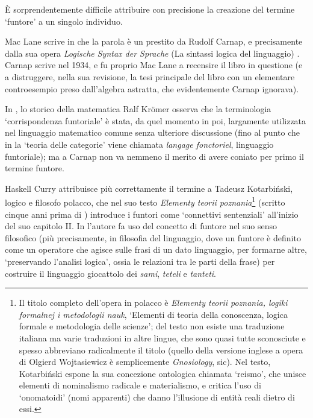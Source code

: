 \begin{terminology}
 È sorprendentemente difficile attribuire con precisione la creazione del termine `funtore' a un singolo individuo.

 Mac Lane scrive in \cite[note al cap. 1]{working-categories} che la parola è un prestito da Rudolf Carnap, e precisamente dalla sua opera \emph{Logische Syntax der Sprache} (La sintassi logica del linguaggio) \cite{carnappio}. Carnap scrive nel 1934, e fu proprio Mac Lane a recensire il libro in questione (e a distruggere, nella sua revisione, la tesi principale del libro con un elementare controesempio preso dall'algebra astratta, che evidentemente Carnap ignorava).

  In \cite{kromer}, lo storico della matematica Ralf Kr\"omer osserva che la terminologia `corrispondenza funtoriale' è stata, da quel momento in poi, largamente utilizzata nel linguaggio matematico comune senza ulteriore discussione (fino al punto che in \cite{grothendieck1965introduction} la `teoria delle categorie' viene chiamata \emph{langage fonctoriel}, linguaggio funtoriale); ma a Carnap non va nemmeno il merito di avere coniato per primo il termine funtore.

 Haskell Curry \cite{Curry1961SomeLA} attribuisce più correttamente il termine a Tadeusz Kotarbiński, logico e filosofo polacco, che nel suo testo \emph{Elementy teorii poznania}\footnote{Il titolo completo dell'opera in polacco è \emph{Elementy teorii poznania, logiki formalnej i metodologii nauk}, `Elementi di teoria della conoscenza, logica formale e metodologia delle scienze'; del testo non esiste una traduzione italiana ma varie traduzioni in altre lingue, che sono quasi tutte sconosciute e spesso abbreviano radicalmente il titolo (quello della versione inglese a opera di Olgierd Wojtasiewicz è semplicemente \emph{Gnosiology}, sic). Nel testo, Kotarbiński espone la sua concezione ontologica chiamata `reismo', che unisce elementi di nominalismo radicale e materialismo, e critica l'uso di `onomatoidi' (nomi apparenti) che danno l'illusione di entità reali dietro di essi.} (scritto cinque anni prima di \cite{carnappio}) introduce i funtori come `connettivi sentenziali' all'inizio del suo capitolo II.  In \cite{Curry1961SomeLA} l'autore fa uso del concetto di funtore nel suo senso filosofico (più precisamente, in filosofia del linguaggio, dove un funtore è definito come un operatore che agisce sulle frasi di un dato linguaggio, per formarne altre, `preservando l'analisi logica', ossia le relazioni tra le parti della frase) per costruire il linguaggio giocattolo dei \emph{sami}, \emph{teteli} e \emph{tanteti}.


\end{terminology}
